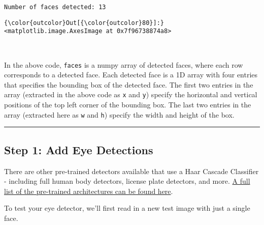 \documentclass[11pt]{article}
\begin{document}
    \begin{Verbatim}[commandchars=\\\{\}]
Number of faces detected: 13

    \end{Verbatim}

\begin{Verbatim}[commandchars=\\\{\}]
{\color{outcolor}Out[{\color{outcolor}80}]:} <matplotlib.image.AxesImage at 0x7f96738874a8>
\end{Verbatim}
            
    \begin{center}
    \end{center}
    { \hspace*{\fill} \\}
    
    In the above code, \texttt{faces} is a numpy array of detected faces,
where each row corresponds to a detected face. Each detected face is a
1D array with four entries that specifies the bounding box of the
detected face. The first two entries in the array (extracted in the
above code as \texttt{x} and \texttt{y}) specify the horizontal and
vertical positions of the top left corner of the bounding box. The last
two entries in the array (extracted here as \texttt{w} and \texttt{h})
specify the width and height of the box.

    \begin{center}\rule{0.5\linewidth}{\linethickness}\end{center}

\hypertarget{step-1-add-eye-detections}{%
\subsection{Step 1: Add Eye
Detections}\label{step-1-add-eye-detections}}

There are other pre-trained detectors available that use a Haar Cascade
Classifier - including full human body detectors, license plate
detectors, and more.
\href{https://github.com/opencv/opencv/tree/master/data/haarcascades}{A
full list of the pre-trained architectures can be found here}.

    To test your eye detector, we'll first read in a new test image with
just a single face.
\end{document}

